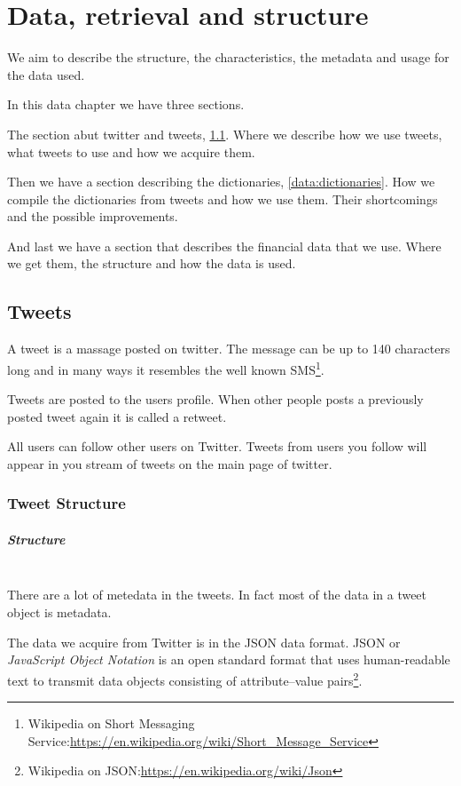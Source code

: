 \chapter{Data, retrieval and structure}\label{data}
We aim to describe the structure, the characteristics, the metadata and usage
for the data used. 

In this data chapter we have three sections. 

The section abut twitter and tweets, \ref{data:tweets}. Where we describe how we
use tweets, what tweets to use and how we acquire them.

Then we have a section describing the dictionaries, \ref{data:dictionaries}. How
we compile the dictionaries from tweets and how we use them. Their shortcomings
and the possible improvements.  

And last we have a section that describes the financial data that we use. Where
we get them, the structure and how the data is used. 
%

\section{Tweets}\label{data:tweets}
A tweet is a massage posted on twitter. The message can be up to 140 characters
long and in many ways it resembles the well known
SMS\footnote{Wikipedia on Short Messaging Service:\url{https://en.wikipedia.org/wiki/Short_Message_Service}}.

Tweets are posted to the users profile. When other people posts a previously
posted tweet again it is called a retweet.

All users can follow other users on Twitter. Tweets from users you follow will
appear in you stream of tweets on the main page of twitter.
%

\subsection{Tweet Structure}
\paragraph{Structure}
\hspace{0pt}\\
There are a lot of metedata in the tweets. In fact most of the data in a tweet
object is metadata. 

The data we acquire from Twitter is in the JSON data format. JSON or \textit{JavaScript
Object Notation} is an open standard format that uses human-readable text to
transmit data objects consisting of attribute–value
pairs\footnote{Wikipedia on JSON:\url{https://en.wikipedia.org/wiki/Json}}.


